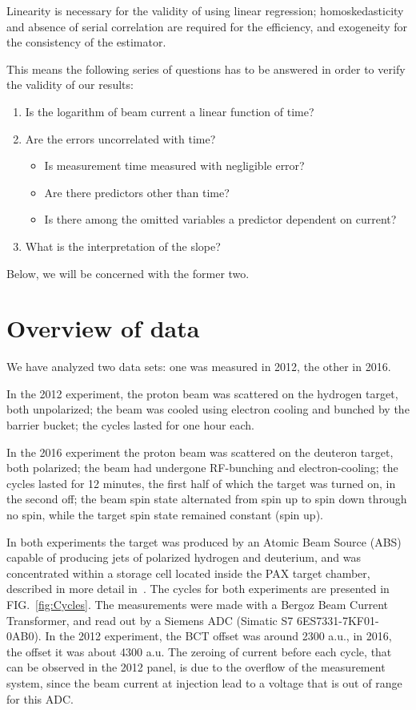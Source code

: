 \documentclass[reprint, superscriptaddress]{revtex4-1}
\begin{document}
Linearity is necessary for the validity of using linear regression; homoskedasticity and absence of serial correlation are required for the efficiency, and exogeneity for the consistency of the estimator.

This means the following series of questions has to be answered in order to verify the validity of our results:
\begin{enumerate}
	\item Is the logarithm of beam current a linear function of time?
	\item Are the errors uncorrelated with time?
		\begin{itemize}
			\item Is measurement time measured with negligible error?
			\item Are there predictors other than time?
			\item Is there among the omitted variables a predictor dependent on current?
		\end{itemize}
	\item What is the interpretation of the slope?
\end{enumerate}

Below, we will be concerned with the former two.

\section{Overview of data}
We have analyzed two data sets: one was measured in 2012, the other in 2016. 

In the 2012 experiment, the proton beam was scattered on the hydrogen target, both unpolarized; the beam was cooled using electron cooling and bunched by the barrier bucket; the cycles lasted for one hour each. 

In the 2016 experiment the proton beam was scattered on the deuteron target, both polarized; the beam had undergone RF-bunching and electron-cooling; the cycles lasted for 12 minutes, the first half of which the target was turned on, in the second off; the beam spin state alternated from spin up to spin down through no spin, while the target spin state remained constant (spin up). 

In both experiments the target was produced by an Atomic Beam Source (ABS) capable of producing jets of polarized hydrogen and deuterium, and was concentrated within a storage cell located inside the PAX target chamber, described in more detail in~\cite{Weidemann}. The cycles for both experiments are presented in FIG.~\ref{fig:Cycles}. The measurements were made with a Bergoz Beam Current Transformer, and read out by a Siemens ADC (Simatic S7 6ES7331-7KF01-0AB0). In the 2012 experiment, the BCT offset was around 2300 a.u., in 2016, the offset it was about 4300 a.u. The zeroing of current before each cycle, that can be observed in the 2012 panel, is due to the overflow of the measurement system, since the beam current at injection lead to a voltage that is out of range for this ADC.
\end{document}
